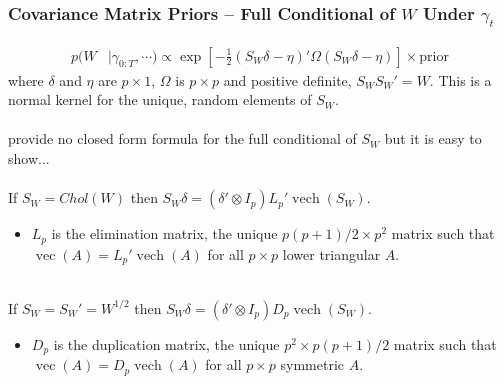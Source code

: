 \documentclass[xcolor=dvipsnames]{beamer}
\DeclareMathOperator{\vech}{vech}
\DeclareMathOperator{\vect}{vec}
\begin{document}
\begin{frame}
\frametitle{Covariance Matrix Priors -- Full Conditional of $W$ Under $\gamma_t$}
\begin{align*}
  p(W&|\gamma_{0:T},\cdots)\propto \exp\left[-\frac{1}{2}(S_W\delta - \eta)'\Omega(S_W\delta - \eta)\right]\times \mbox{prior}
\end{align*}
where  $\delta$ and $\eta$ are $p\times 1$, $\Omega$ is $p\times p$  and positive definite, $S_WS_W'=W$. This is a normal kernel for the unique, random elements of $S_W$. \\~\\
\pause\cite{fruhwirth2008bayesian} provide no closed form formula for the full conditional of $S_W$ but it is easy to show...\\~\\

\pause If $S_W=Chol(W)$ then $S_W\delta = (\delta' \otimes I_p)L_p'\vech(S_W)$.
\begin{itemize}
\item $L_p$ is the elimination matrix, the unique $p(p+1)/2\times p^2$ matrix such that $\vect(A)=L_p'\vech(A)$ for all $p\times p$ lower triangular $A$.\\~\\
\end{itemize}
\pause If $S_W=S_W'=W^{1/2}$ then $S_W\delta = (\delta' \otimes I_p)D_p\vech(S_W)$.
\begin{itemize}
\item $D_p$ is the duplication matrix, the unique $p^2\times p(p+1)/2$ matrix such that $\vect(A)=D_p\vech(A)$ for all $p\times p$ symmetric $A$.
\end{itemize}
\end{frame}
\end{document}
